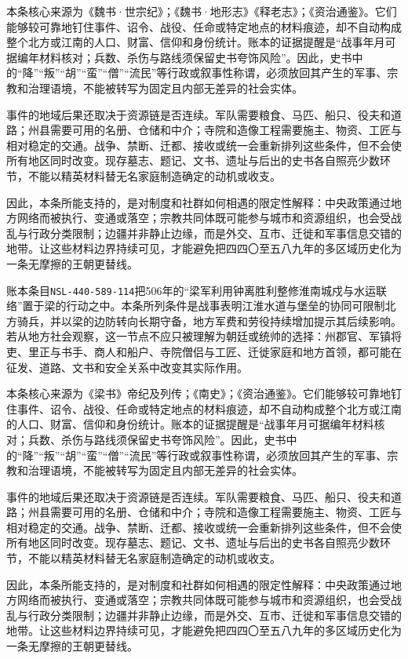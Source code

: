 本条核心来源为《魏书·世宗纪》；《魏书·地形志》《释老志》；《资治通鉴》。它们能够较可靠地钉住事件、诏令、战役、任命或特定地点的材料痕迹，却不自动构成整个北方或江南的人口、财富、信仰和身份统计。账本的证据提醒是“战事年月可据编年材料核对；兵数、杀伤与路线须保留史书夸饰风险”。因此，史书中的“降”“叛”“胡”“蛮”“僧”“流民”等行政或叙事性称谓，必须放回其产生的军事、宗教和治理语境，不能被转写为固定且内部无差异的社会实体。

事件的地域后果还取决于资源链是否连续。军队需要粮食、马匹、船只、役夫和道路；州县需要可用的名册、仓储和中介；寺院和造像工程需要施主、物资、工匠与相对稳定的交通。战争、禁断、迁都、接收或统一会重新排列这些条件，但不会使所有地区同时改变。现存墓志、题记、文书、遗址与后出的史书各自照亮少数环节，不能以精英材料替无名家庭制造确定的动机或收支。

因此，本条所能支持的，是对制度和社群如何相遇的限定性解释：中央政策通过地方网络而被执行、变通或落空；宗教共同体既可能参与城市和资源组织，也会受战乱与行政分类限制；边疆并非静止边缘，而是外交、互市、迁徙和军事信息交错的地带。让这些材料边界持续可见，才能避免把四四〇至五八九年的多区域历史化为一条无摩擦的王朝更替线。

账本条目\texttt{NSL-440-589-114}把506年的“梁军利用钟离胜利整修淮南城戍与水运联络”置于梁的行动之中。本条所列条件是战事表明江淮水道与堡垒的协同可限制北方骑兵，并以梁的边防转向长期守备，地方军费和劳役持续增加提示其后续影响。若从地方社会观察，这一节点不应只被理解为朝廷或统帅的选择：州郡官、军镇将吏、里正与书手、商人和船户、寺院僧侣与工匠、迁徙家庭和地方首领，都可能在征发、道路、文书和安全关系中改变其实际作用。

本条核心来源为《梁书》帝纪及列传；《南史》；《资治通鉴》。它们能够较可靠地钉住事件、诏令、战役、任命或特定地点的材料痕迹，却不自动构成整个北方或江南的人口、财富、信仰和身份统计。账本的证据提醒是“战事年月可据编年材料核对；兵数、杀伤与路线须保留史书夸饰风险”。因此，史书中的“降”“叛”“胡”“蛮”“僧”“流民”等行政或叙事性称谓，必须放回其产生的军事、宗教和治理语境，不能被转写为固定且内部无差异的社会实体。

事件的地域后果还取决于资源链是否连续。军队需要粮食、马匹、船只、役夫和道路；州县需要可用的名册、仓储和中介；寺院和造像工程需要施主、物资、工匠与相对稳定的交通。战争、禁断、迁都、接收或统一会重新排列这些条件，但不会使所有地区同时改变。现存墓志、题记、文书、遗址与后出的史书各自照亮少数环节，不能以精英材料替无名家庭制造确定的动机或收支。

因此，本条所能支持的，是对制度和社群如何相遇的限定性解释：中央政策通过地方网络而被执行、变通或落空；宗教共同体既可能参与城市和资源组织，也会受战乱与行政分类限制；边疆并非静止边缘，而是外交、互市、迁徙和军事信息交错的地带。让这些材料边界持续可见，才能避免把四四〇至五八九年的多区域历史化为一条无摩擦的王朝更替线。

